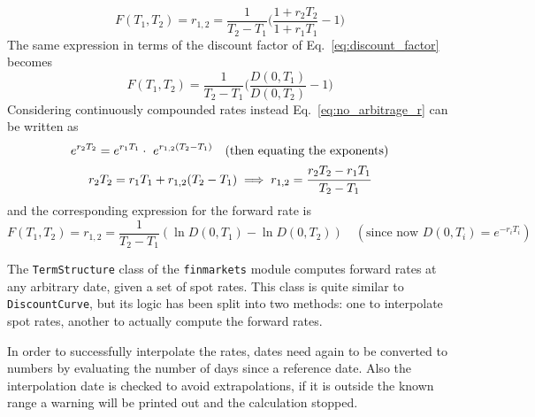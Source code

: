 \begin{equation}
F(T_1, T_2) = r_{1,2} = \frac{1}{T_2 - T_1}\Big(\frac{1+r_2 T_2}{1+r_1 T_1} - 1 \Big)
\label{eq:forward_rate_simple}
\end{equation}
The same expression in terms of the discount factor of Eq.~\ref{eq:discount_factor} becomes
\begin{equation}
F(T_1, T_2) = \frac{1}{T_2 - T_1}\Big(\frac{D(0, T_1)}{D(0, T_2)} - 1 \Big)
\end{equation}
Considering continuously compounded rates instead Eq.~\ref{eq:no_arbitrage_r} can be written as
\begin{equation}
\begin{gathered}
e^{r_{2}T_{2}}=e^{r_{1}T_{1}}\cdot \ e^{r_{1,2} (T_{2}-T_{1})}\quad(\textrm{then equating the exponents})\\
r_{2}T_{2}=r_{1}T_{1}+r_{1,2}(T_{2}-T_{1})\implies r_{1,2} = \cfrac{r_2 T_2 - r_1 T_1}{T_2 - T_1} 
\end{gathered}
\end{equation}
and the corresponding expression for the forward rate is
\begin{equation}
F(T_1, T_2) = r_{1,2} = \frac {1}{T_{2}-T_{1}}(\ln D(0,T_{1})-\ln D(0,T_{2}))
\quad(\textrm{since now } D(0, T_i)=e^{-r_i T_i})
\label{eq:forward_rate_continous}
\end{equation}

\begin{finmarkets}
The \texttt{TermStructure} class of the \texttt{finmarkets} module computes forward rates at any arbitrary date, given a set of spot rates. This class is quite similar to \texttt{DiscountCurve}, but its logic has been split into two methods: one to interpolate spot rates, another to actually compute the forward rates.

In order to successfully interpolate the rates, dates need again to be converted to numbers by evaluating the number of days since a reference date. Also the interpolation date is checked to avoid extrapolations, if it is outside the known range a warning will be printed out and the calculation stopped.
\end{finmarkets}


